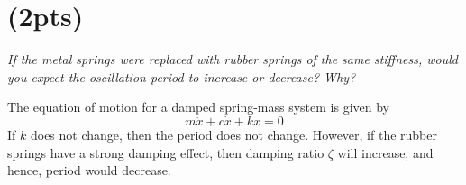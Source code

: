 \section{(2pts)}
\textit{If the metal springs were replaced with rubber springs of the same stiffness, would 
you expect the oscillation period to increase or decrease? Why?}

The equation of motion for a damped spring-mass system is given by
\begin{equation*}
    m\ddot{x} + c\dot{x} + kx = 0
\end{equation*}
If $k$ does not change, then the period does not change. However, if the rubber springs have a strong damping effect, then damping ratio $\zeta$ will increase, and hence, period would decrease.